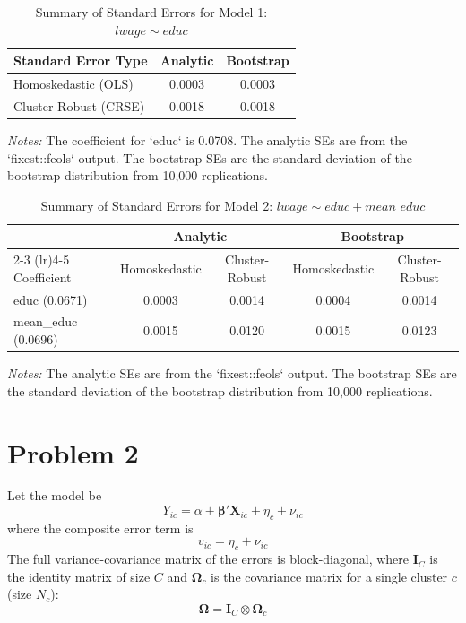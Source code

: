 \documentclass[12pt]{article}
\begin{document}
\begin{table}[H]
    \centering
    \caption{Summary of Standard Errors for Model 1: $lwage \sim educ$}
    \label{tab:summary_model_1}
    \begin{tabular}{lcc}
        \toprule
        Standard Error Type & Analytic & Bootstrap \\
        \midrule
        Homoskedastic (OLS) & 0.0003 & 0.0003 \\
        Cluster-Robust (CRSE) & 0.0018 & 0.0018 \\
        \bottomrule
    \end{tabular}
    \begin{minipage}{\linewidth}
    \footnotesize
    \textit{Notes:} The coefficient for `educ` is 0.0708. The analytic SEs are from the `fixest::feols` output. The bootstrap SEs are the standard deviation of the bootstrap distribution from 10,000 replications.
    \end{minipage}
\end{table}

\begin{table}[H]
    \centering
    \caption{Summary of Standard Errors for Model 2: $lwage \sim educ + mean\_educ$}
    \label{tab:summary_model_2}
    \begin{tabular}{lcccc}
        \toprule
        & \multicolumn{2}{c}{Analytic} & \multicolumn{2}{c}{Bootstrap} \\
        \cmidrule(lr){2-3} \cmidrule(lr){4-5}
        Coefficient & Homoskedastic & Cluster-Robust & Homoskedastic & Cluster-Robust \\
        \midrule
        educ (0.0671) & 0.0003 & 0.0014 & 0.0004 & 0.0014 \\
        mean\_educ (0.0696) & 0.0015 & 0.0120 & 0.0015 & 0.0123 \\
        \bottomrule
    \end{tabular}
    \begin{minipage}{\linewidth}
    \footnotesize
    \textit{Notes:} The analytic SEs are from the `fixest::feols` output. The bootstrap SEs are the standard deviation of the bootstrap distribution from 10,000 replications.
    \end{minipage}
\end{table}

\section{Problem 2}
Let the model be
\begin{equation}
    Y_{ic} = \alpha + \boldsymbol{\beta}'\mathbf{X}_{ic} + \eta_c + \nu_{ic}
\end{equation}
where the composite error term is 
\begin{equation}
    v_{ic} = \eta_c + \nu_{ic}
\end{equation}
The full variance-covariance matrix of the errors is block-diagonal, where $\mathbf{I}_C$ is the identity matrix of size $C$ and $\boldsymbol{\Omega}_c$ is the covariance matrix for a single cluster $c$ (size $N_c$):
\begin{equation}
    \mathbf{\Omega} = \mathbf{I}_C \otimes \boldsymbol{\Omega}_c
\end{equation}
\end{document}
